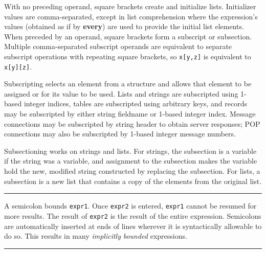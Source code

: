 
\noindent
With no preceding operand, square brackets create and initialize lists.
Initializer values are comma-separated, except in list comprehension
where the expression's values (obtained as if by \textbf{every}) are used
to provide the initial list elements.
When preceded by an operand, square brackets form a subscript or
subsection. Multiple comma-separated subscript operands are equivalent
to separate subscript operations with repeating square brackets, so
\texttt{x[y,z]} is equivalent to \texttt{x[y][z]}.

Subscripting selects an element from a structure and allows that element
to be assigned or for its value to be used. Lists and strings are
subscripted using 1-based integer indices, tables are subscripted using
arbitrary keys, and records may be subscripted by either string
fieldname or 1-based integer index. Message connections may be
subscripted by string header to obtain server responses; POP
connections may also be subscripted by 1-based integer message numbers.

Subsectioning works on strings and lists. For strings, the subsection is
a variable if the string was a variable, and
assignment to the subsection makes the
variable hold the new, modified string constructed by replacing the subsection.
For lists, a subsection is a new
list that contains a copy of the elements from the original list.

\bigskip\hrule\vspace{0.1cm}

\noindent
A semicolon bounds \texttt{expr1}. Once \texttt{expr2} is entered,
\texttt{expr1} cannot be resumed for more results. The result of
\texttt{expr2} is the result of the entire expression.
Semicolons are automatically
inserted at ends of lines wherever it is syntactically
allowable to do so. This results in many \textit{implicitly} 
\textit{bounded} expressions.

\bigskip\hrule\vspace{0.1cm}


